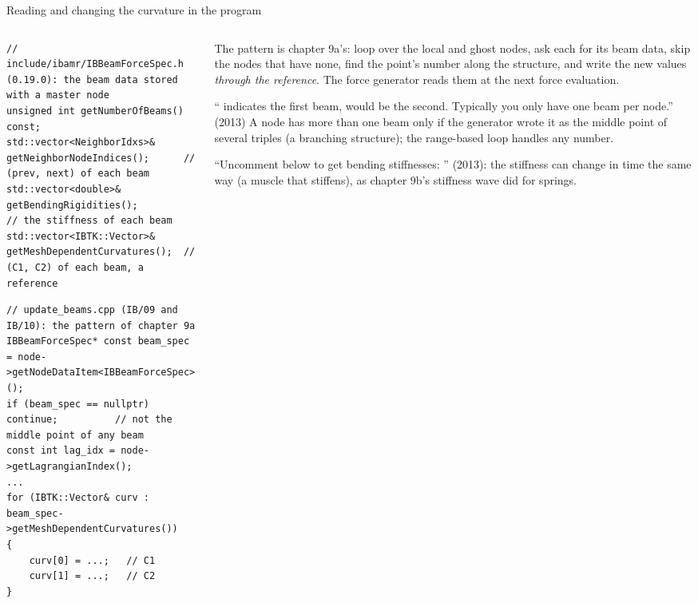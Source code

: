 \documentclass[aspectratio=169,11pt]{beamer}
\begin{document}
\begin{frame}[fragile]{Reading and changing the curvature in the program}
\label{fr:api}
\begin{columns}[T,onlytextwidth]
\begin{column}{0.56\textwidth}
\begin{lstlisting}[style=cpptiny]
// include/ibamr/IBBeamForceSpec.h (0.19.0): the beam data stored with a master node
unsigned int getNumberOfBeams() const;
std::vector<NeighborIdxs>& getNeighborNodeIndices();      // (prev, next) of each beam
std::vector<double>& getBendingRigidities();              // the stiffness of each beam
std::vector<IBTK::Vector>& getMeshDependentCurvatures();  // (C1, C2) of each beam, a reference
\end{lstlisting}
\begin{lstlisting}[style=cpptiny]
// update_beams.cpp (IB/09 and IB/10): the pattern of chapter 9a
IBBeamForceSpec* const beam_spec = node->getNodeDataItem<IBBeamForceSpec>();
if (beam_spec == nullptr) continue;          // not the middle point of any beam
const int lag_idx = node->getLagrangianIndex();
...
for (IBTK::Vector& curv : beam_spec->getMeshDependentCurvatures())
{
    curv[0] = ...;   // C1
    curv[1] = ...;   // C2
}
\end{lstlisting}
\end{column}
\begin{column}{0.42\textwidth}
\footnotesize The pattern is chapter 9a's: loop over the local and ghost nodes, ask each for its beam data, skip the nodes that have none, find the point's number along the structure, and write the new values \emph{through the reference}. The force generator reads them at the next force evaluation.
\vspace{1mm}

\footnotesize ``\code{[0]} indicates the first beam, \code{[1]} would be the second. Typically you only have one beam per node.'' (2013) A node has more than one beam only if the generator wrote it as the middle point of several triples (a branching structure); the range-based loop handles any number.
\vspace{1mm}

\footnotesize ``Uncomment below to get bending stiffnesses: '' (2013): the stiffness can change in time the same way (a muscle that stiffens), as chapter 9b's stiffness wave did for springs.
\end{column}
\end{columns}
\end{frame}
\end{document}
